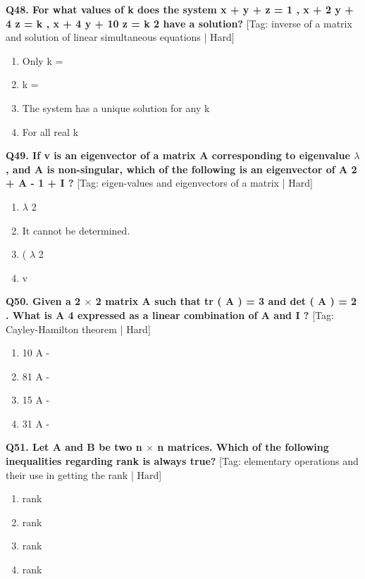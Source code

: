 \noindent\textbf{Q48. For what values of k does the system x + y + z = 1 , x + 2 y + 4 z = k , x + 4 y + 10 z = k 2 have a solution?} \hfill [Tag: inverse of a matrix and solution of linear simultaneous equations | Hard]
\begin{enumerate}[label=(\alph*),topsep=2pt,itemsep=1pt,partopsep=0pt,parsep=0pt]
    \item {{Only k =}}
    \item {{k =}}
    \item {{The system has a unique solution for any k}}
    \item {{For all real k}}
\end{enumerate}
\vspace{2mm}

\noindent\textbf{Q49. If v is an eigenvector of a matrix A corresponding to eigenvalue $\lambda$ , and A is non-singular, which of the following is an eigenvector of A 2 + A - 1 + I ?} \hfill [Tag: eigen-values and eigenvectors of a matrix | Hard]
\begin{enumerate}[label=(\alph*),topsep=2pt,itemsep=1pt,partopsep=0pt,parsep=0pt]
    \item {{$\lambda$ 2}}
    \item {{It cannot be determined.}}
    \item {{( $\lambda$ 2}}
    \item {{v}}
\end{enumerate}
\vspace{2mm}

\noindent\textbf{Q50. Given a 2 $\times$ 2 matrix A such that tr ( A ) = 3 and det ( A ) = 2 . What is A 4 expressed as a linear combination of A and I ?} \hfill [Tag: Cayley-Hamilton theorem | Hard]
\begin{enumerate}[label=(\alph*),topsep=2pt,itemsep=1pt,partopsep=0pt,parsep=0pt]
    \item {{10 A -}}
    \item {{81 A -}}
    \item {{15 A -}}
    \item {{31 A -}}
\end{enumerate}
\vspace{2mm}

\noindent\textbf{Q51. Let A and B be two n $\times$ n matrices. Which of the following inequalities regarding rank is always true?} \hfill [Tag: elementary operations and their use in getting the rank | Hard]
\begin{enumerate}[label=(\alph*),topsep=2pt,itemsep=1pt,partopsep=0pt,parsep=0pt]
    \item {{rank}}
    \item {{rank}}
    \item {{rank}}
    \item {{rank}}
\end{enumerate}
\vspace{2mm}

